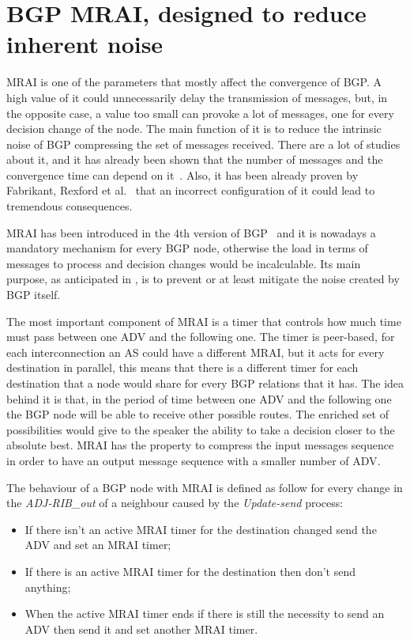 
\section{BGP MRAI, designed to reduce inherent noise}
\label{sec:bgp_mrai}

\ac{MRAI} is one of the parameters that mostly affect the convergence of \ac{BGP}.
A high value of it could unnecessarily delay the transmission of messages, but,
in the opposite case, a value too small can provoke a lot of messages, one for
every decision change of the node.
The main function of it is to reduce the intrinsic noise of \ac{BGP} compressing
the set of messages received.
There are a lot of studies about it, and it has already been shown that
the number of messages and the convergence time can depend on it~\cite{griffin2001experimental}.
Also, it has been already proven by Fabrikant, Rexford et al.~\cite{fabrikant2011there}
that an incorrect configuration of it could lead to tremendous consequences.

\ac{MRAI} has been introduced in the \num{4}th version of \ac{BGP}~\cite{rfc4271} and
it is nowadays a mandatory mechanism for every \ac{BGP} node, otherwise the load
in terms of messages to process and decision changes would be incalculable.
Its main purpose, as anticipated in , is to prevent or
at least mitigate the noise created by \ac{BGP} itself.

The most important component of \ac{MRAI} is a timer that controls how much time must pass
between one \ac{ADV} and the following one.
The timer is peer-based, for each interconnection an \ac{AS} could have a different
\ac{MRAI}, but it acts for every destination in parallel, this means that there
is a different timer for each destination that a node would share for every
\ac{BGP} relations that it has.
The idea behind it is that, in the period of time between one \ac{ADV} and the
following one the \ac{BGP} node will be able to receive other possible routes.
The enriched set of possibilities would give to the speaker the ability to take
a decision closer to the absolute best.
\ac{MRAI} has the property to compress the input messages sequence in order to have
an output message sequence with a smaller number of \ac{ADV}.

The behaviour of a \ac{BGP} node with \ac{MRAI} is defined as follow for every
change in the \textit{ADJ-RIB\_out} of a neighbour caused by the
\textit{Update-send} process:
\begin{itemize}
	\item If there isn't an active \ac{MRAI} timer for the destination changed
		send the \ac{ADV} and set an \ac{MRAI} timer;
	\item If there is an active \ac{MRAI} timer for the destination then
		don't send anything;
	\item When the active \ac{MRAI} timer ends if there is still the necessity
		to send an \ac{ADV} then send it and set another \ac{MRAI} timer.
\end{itemize}

